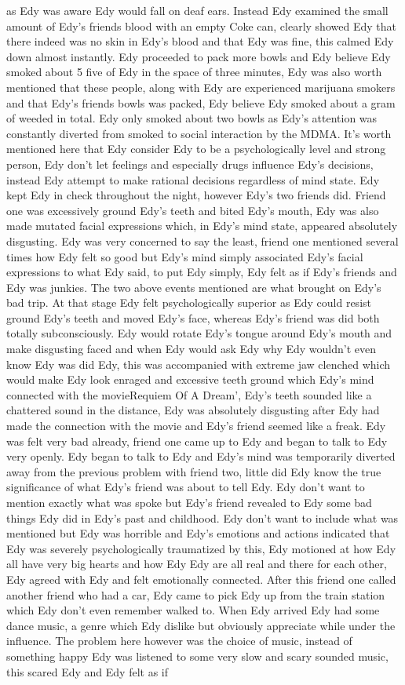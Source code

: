 \documentclass[12pt]{book}
\begin{document}
as Edy was aware Edy would fall on deaf ears. Instead Edy examined the small amount of Edy's friends blood with an empty Coke can, clearly showed Edy that there indeed was no skin in Edy's blood and that Edy was fine, this calmed Edy down almost instantly. Edy proceeded to pack more bowls and Edy believe Edy smoked about 5 five of Edy in the space of three minutes, Edy was also worth mentioned that these people, along with Edy are experienced marijuana smokers and that Edy's friends bowls was packed, Edy believe Edy smoked about a gram of weeded in total. Edy only smoked about two bowls as Edy's attention was constantly diverted from smoked to social interaction by the MDMA. It's worth mentioned here that Edy consider Edy to be a psychologically level and strong person, Edy don't let feelings and especially drugs influence Edy's decisions, instead Edy attempt to make rational decisions regardless of mind state. Edy kept Edy in check throughout the night, however Edy's two friends did. Friend one was excessively ground Edy's teeth and bited Edy's mouth, Edy was also made mutated facial expressions which, in Edy's mind state, appeared absolutely disgusting. Edy was very concerned to say the least, friend one mentioned several times how Edy felt so good but Edy's mind simply associated Edy's facial expressions to what Edy said, to put Edy simply, Edy felt as if Edy's friends and Edy was junkies. The two above events mentioned are what brought on Edy's bad trip. At that stage Edy felt psychologically superior as Edy could resist ground Edy's teeth and moved Edy's face, whereas Edy's friend was did both totally subconsciously. Edy would rotate Edy's tongue around Edy's mouth and make disgusting faced and when Edy would ask Edy why Edy wouldn't even know Edy was did Edy, this was accompanied with extreme jaw clenched which would make Edy look enraged and excessive teeth ground which Edy's mind connected with the movieRequiem Of A Dream', Edy's teeth sounded like a chattered sound in the distance, Edy was absolutely disgusting after Edy had made the connection with the movie and Edy's friend seemed like a freak. Edy was felt very bad already, friend one came up to Edy and began to talk to Edy very openly. Edy began to talk to Edy and Edy's mind was temporarily diverted away from the previous problem with friend two, little did Edy know the true significance of what Edy's friend was about to tell Edy. Edy don't want to mention exactly what was spoke but Edy's friend revealed to Edy some bad things Edy did in Edy's past and childhood. Edy don't want to include what was mentioned but Edy was horrible and Edy's emotions and actions indicated that Edy was severely psychologically traumatized by this, Edy motioned at how Edy all have very big hearts and how Edy Edy are all real and there for each other, Edy agreed with Edy and felt emotionally connected. After this friend one called another friend who had a car, Edy came to pick Edy up from the train station which Edy don't even remember walked to. When Edy arrived Edy had some dance music, a genre which Edy dislike but obviously appreciate while under the influence. The problem here however was the choice of music, instead of something happy Edy was listened to some very slow and scary sounded music, this scared Edy and Edy felt as if 
\end{document}
